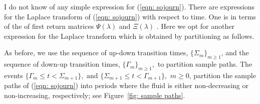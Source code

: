 I do not know of any simple expression for (\ref{eqn: sojourn}). There are expressions for the Laplace transform of (\ref{eqn: sojourn}) with respect to time. One is in terms of the of first return matrices \(\Psi(\lambda)\) and \(\Xi(\lambda)\) \citep{bean2009}. Here we opt for another expression for the Laplace transform which is obtained by partitioning as follows.

As before, we use the sequence of up-down transition times, \(\{\Sigma_m\}_{m\geq 1}\), and the sequence of down-up transition times, \(\{\Gamma_m\}_{m\geq 1},\) to partition sample paths. The events \(\{\Gamma_m\leq t< \Sigma_{m+1}\} , \mbox{ and } \{\Sigma_{m+1}\leq t< \Gamma_{m+1}\}, \) \(m\geq 0\), partition the sample paths of (\ref{eqn: sojourn}) into periods where the fluid is either non-decreasing or non-increasing, respectively; see Figure~\ref{fig: sample paths}.
